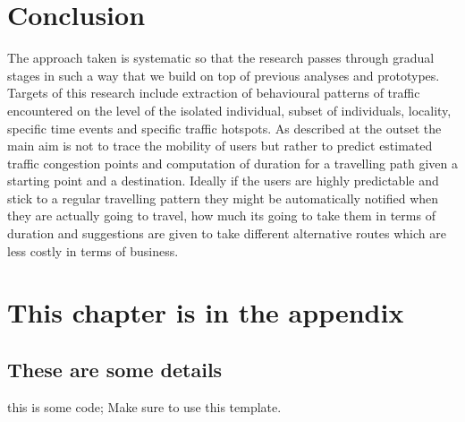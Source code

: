 \documentclass[12pt, a4paper]{report}
\newenvironment{code}
{\footnotesize\verbatim}{\endverbatim\normalfont}
\theoremstyle{definition}
\theoremstyle{definition}%
\theoremstyle{definition}%
\theoremstyle{definition}%
\theoremstyle{definition}%
\theoremstyle{definition}%
\begin{document}
\chapter{Conclusion}
 The approach taken is systematic so that the research passes through gradual stages in such a way that we build on top of previous analyses and prototypes. Targets of this research include extraction of behavioural patterns of traffic encountered on the level of the isolated individual, subset of individuals, locality, specific time events and specific traffic hotspots. As described at the outset the main aim is not to trace the mobility of users but rather to predict estimated traffic congestion points and computation of duration for a travelling path given a starting point and a destination. Ideally if the users are highly predictable and stick to a regular travelling pattern they might be automatically notified when they are actually going to travel, how much its going to take them in terms of duration and suggestions are given to take different alternative routes which are less costly in terms of business. 

\appendix

\chapter{This chapter is in the appendix}
\section{These are some details}
\begin{code}
this is some code;
Make sure to use this template.
\end{code}


\bibliomatter

 
 
\end{document}

